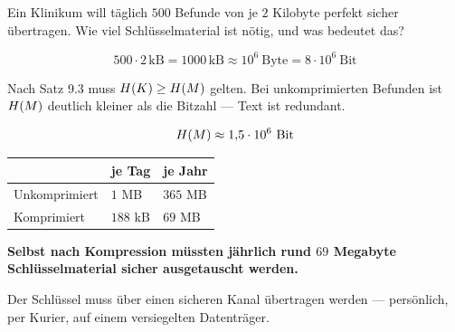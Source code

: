 \begin{aufgabe}
Ein Klinikum will täglich $500$ Befunde von je $2$ Kilobyte perfekt sicher übertragen. Wie viel Schlüsselmaterial ist nötig, und was bedeutet das?

\loesung
{}
\[ 500 \cdot 2\,\text{kB} = 1000\,\text{kB} \approx 10^{6} \ \text{Byte} = 8\cdot10^{6} \ \text{Bit} \]

Nach Satz 9.3 muss $H(K) \ge H(M)$ gelten. Bei unkomprimierten Befunden ist $H(M)$ deutlich kleiner als die Bitzahl --- Text ist redundant.

\[ \Ent(M) \approx 1{,}5\cdot10^{6} \ \text{Bit} \]

\begin{center}
\renewcommand{\arraystretch}{1.48}
\begin{tabular}{@{}P{2.8cm}P{2.4cm}P{2.4cm}@{}}
\toprule
& \textbf{je Tag} & \textbf{je Jahr}\\
\midrule
Unkomprimiert & $1$ MB & $365$ MB\\
Komprimiert & $188$ kB & $69$ MB\\
\bottomrule
\end{tabular}
\end{center}

\begin{center}
\begin{minipage}{0.9\textwidth}
\textbf{Selbst nach Kompression müssten jährlich rund $69$ Megabyte Schlüsselmaterial sicher ausgetauscht werden.}
\end{minipage}
\end{center}

Der Schlüssel muss über einen sicheren Kanal übertragen werden --- persönlich, per Kurier, auf einem versiegelten Datenträger.

\begin{center}
\begin{minipage}{0.88\textwidth}
\end{minipage}
\end{center}


\end{aufgabe}
